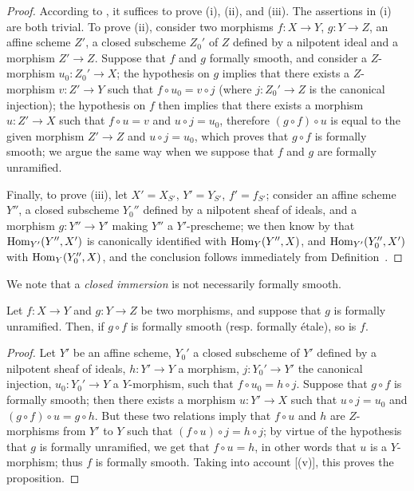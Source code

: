 \begin{proof}
According to , it suffices to prove (i), (ii), and (iii). 
The assertions in (i) are both trivial.
To prove (ii), consider two morphisms $f:X\to Y$, $g:Y\to Z$, an affine scheme $Z'$, a closed subscheme $Z_0'$ of $Z$ defined by a nilpotent ideal and a morphism $Z'\to Z$. 
Suppose that $f$ and $g$ formally smooth, and consider a $Z$-morphism
$u_0:Z_0'\to X$;
the hypothesis  on $g$ implies that there exists a $Z$-morphism $v:Z'\to Y$ such that $f\circ u_0=v\circ j$ (where $j:Z_0'\to Z$ is the canonical injection);
the hypothesis on $f$ then implies that there exists a morphism $u:Z'\to X$ such that $f\circ u=v$ and $u\circ j=u_0$, therefore $(g\circ f)\circ u$ is equal to the given morphism $Z'\to Z$ and $u\circ j=u_0$, which proves that $g\circ f$ is formally smooth;
we argue the same way when we suppose that $f$ and $g$ are formally unramified.

Finally, to prove (iii), let $X'=X_{S'}$, $Y'=Y_{S'}$, $f'=f_{S'}$;
consider an affine scheme $Y''$, a closed subscheme $Y_0''$ defined by a nilpotent sheaf of ideals, and a morphism $g:Y''\to Y'$ making $Y''$ a $Y'$-prescheme;
we then know by  that $\operatorname{Hom}_{Y'}(Y'',X')$ is canonically identified with $\operatorname{Hom}_Y(Y'',X)$, and $\operatorname{Hom}_{Y'}(Y_0'',X')$ with $\operatorname{Hom}_Y(Y_0'',X)$, and the conclusion follows immediately from Definition~.
\end{proof}

We note that a \emph{closed immersion} is not necessarily formally smooth.
\begin{proposition}[17.1.4]
\label{IV.17.1.4}
Let $f:X\to Y$ and $g:Y\to Z$ be two morphisms, and suppose that $g$ is formally unramified.
Then, if $g\circ f$ is formally smooth (resp. formally \'etale), so is $f$.
\end{proposition}

\begin{proof}
Let $Y'$ be an affine scheme, $Y_0'$ a closed subscheme of $Y'$ defined by a nilpotent sheaf of ideals, $h:Y'\to Y$ a morphism, $j:Y_0'\to Y'$ the canonical injection, $u_0:Y_0'\to Y$ a $Y$-morphism, such that $f\circ u_0=h\circ j$. 
Suppose that $g\circ f$ is formally smooth;
then there exists a morphism $u:Y'\to X$ such that $u\circ j=u_0$ and $(g\circ f)\circ u=g\circ h$. 
But these two relations imply that $f\circ u$ and $h$ are $Z$-morphisms from $Y'$ to $Y$ such that $(f\circ u)\circ j=h\circ j$;
by virtue of the hypothesis that $g$ is formally unramified, we get that $f\circ u=h$, in other words that $u$ is a $Y$-morphism;
thus $f$ is formally smooth.
Taking into account [(v)], this proves the proposition.
\end{proof}

